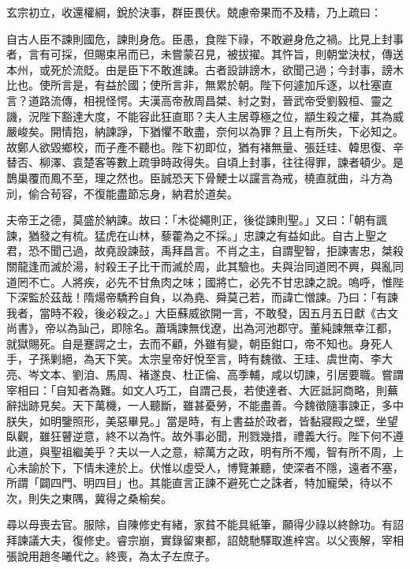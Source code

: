 \begin{pinyinscope}
 玄宗初立，收還權綱，銳於決事，群臣畏伏。兢慮帝果而不及精，乃上疏曰：



 自古人臣不諫則國危，諫則身危。臣愚，食陛下祿，不敢避身危之禍。比見上封事者，言有可採，但賜束帛而已，未嘗蒙召見，被拔擢。其忤旨，則朝堂決杖，傳送本州，或死於流貶。由是臣下不敢進諫。古者設誹謗木，欲聞己過；今封事，謗木比也。使所言是，有益於國；使所言非，無累於朝。陛下何遽加斥逐，以杜塞直言？道路流傳，相視怪愕。夫漢高帝赦周昌桀、紂之對，晉武帝受劉毅桓、靈之譏，況陛下豁達大度，不能容此狂直耶？夫人主居尊極之位，顓生殺之權，其為威嚴峻矣。開情抱，納諫諍，下猶懼不敢盡，奈何以為罪？且上有所失，下必知之。故鄭人欲毀鄉校，而子產不聽也。陛下初即位，猶有褚無量、張廷珪、韓思復、辛替否、柳澤、袁楚客等數上疏爭時政得失。自頃上封事，往往得罪，諫者頓少。是鵲巢覆而鳳不至，理之然也。臣誠恐天下骨鯁士以讜言為戒，橈直就曲，斗方為刓，偷合茍容，不復能盡節忘身，納君於道矣。



 夫帝王之德，莫盛於納諫。故曰：「木從繩則正，後從諫則聖。」又曰：「朝有諷諫，猶發之有梳。猛虎在山林，藜藿為之不採。」忠諫之有益如此。自古上聖之君，恐不聞己過，故堯設諫鼓，禹拜昌言。不肖之主，自謂聖智，拒諫害忠，桀殺關龍逢而滅於湯，紂殺王子比干而滅於周，此其驗也。夫與治同道罔不興，與亂同道罔不亡。人將疾，必先不甘魚肉之味；國將亡，必先不甘忠諫之說。嗚呼，惟陛下深監於茲哉！隋煬帝驕矜自負，以為堯、舜莫己若，而諱亡憎諫。乃曰：「有諫我者，當時不殺，後必殺之。」大臣蘇威欲開一言，不敢發，因五月五日獻《古文尚書》，帝以為訕己，即除名。蕭瑀諫無伐遼，出為河池郡守。董純諫無幸江都，就獄賜死。自是蹇諤之士，去而不顧，外雖有變，朝臣鉗口，帝不知也。身死人手，子孫剿絕，為天下笑。太宗皇帝好悅至言，時有魏徵、王珪、虞世南、李大亮、岑文本、劉洎、馬周、褚遂良、杜正倫、高季輔，咸以切諫，引居要職。嘗謂宰相曰：「自知者為難。如文人巧工，自謂己長，若使達者、大匠詆訶商略，則蕪辭拙跡見矣。天下萬機，一人聽斷，雖甚憂勞，不能盡善。今魏徵隨事諫正，多中朕失，如明鑒照形，美惡畢見。」當是時，有上書益於政者，皆黏寢殿之壁，坐望臥觀，雖狂瞽逆意，終不以為忤。故外事必聞，刑戮幾措，禮義大行。陛下何不遵此道，與聖祖繼美乎？夫以一人之意，綜萬方之政，明有所不燭，智有所不周，上心未諭於下，下情未達於上。伏惟以虛受人，博覽兼聽，使深者不隱，遠者不塞，所謂「闢四門、明四目」也。其能直言正諫不避死亡之誅者，特加寵榮，待以不次，則失之東隅，冀得之桑榆矣。



 尋以母喪去官。服除，自陳修史有緒，家貧不能具紙筆，願得少祿以終餘功。有詔拜諫議大夫，復修史。睿宗崩，實錄留東都，詔兢馳驛取進梓宮。以父喪解，宰相張說用趙冬曦代之。終喪，為太子左庶子。




\end{pinyinscope}
